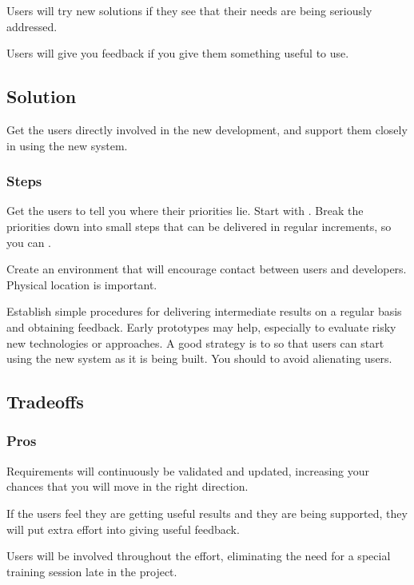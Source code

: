 \documentclass[a4paper,10pt,twoside]{book}
\begin{document}
\begin{bulletlist}
\item Users will try new solutions if they see that their needs are being seriously addressed.

\item Users will give you feedback if you give them something useful to use.
\end{bulletlist}

\subsection*{Solution}

Get the users directly involved in the new development, and support them closely in using the new system.

\subsubsection*{Steps}

Get the users to tell you where their priorities lie. Start with . Break the priorities down into small steps that can be delivered in regular increments, so you can .

Create an environment that will encourage contact between users and developers. Physical location is important.

Establish simple procedures for delivering intermediate results on a regular basis and obtaining feedback. Early prototypes may help, especially to evaluate risky new technologies or approaches. A good strategy is to  so that users can start using the new system as it is being built. You should  to avoid alienating users.

\subsection*{Tradeoffs}

\subsubsection*{Pros}

\begin{bulletlist}
\item Requirements will continuously be validated and updated, increasing your chances that you will move in the right direction.

\item If the users feel they are getting useful results and they are being supported, they will put extra effort into giving useful feedback.

\item Users will be involved throughout the effort, eliminating the need for a special training session late in the project.
\end{bulletlist}
\end{document}
